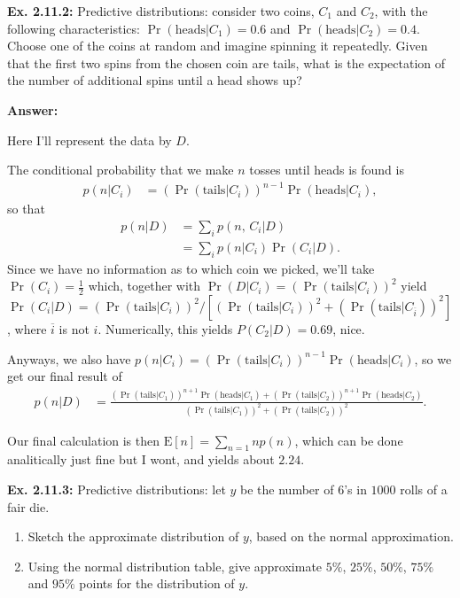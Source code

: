 \documentclass{article}
\newcommand\oname\operatorname
\begin{document}
\textbf{Ex. 2.11.2: }Predictive distributions: consider two coins, $C_1$ and $C_2$, with the following characteristics: $\oname{Pr}(\text{heads}|C_1)=0.6$ and $\oname{Pr}(\text{heads}|C_2)=0.4$. Choose one of the coins at random and imagine spinning it repeatedly. Given that the first two spins from the chosen coin are tails, what is the expectation of the number of additional spins until a head shows up?

\textbf{Answer:}

Here I'll represent the data by $D$.

The conditional probability that we make $n$ tosses until heads is found is
\begin{align*}
	p(n|C_i)&=\left(\oname{Pr}(\text{tails}|C_i)\right)^{n-1}\oname{Pr}(\text{heads}|C_i),
\end{align*}
so that
\begin{align*}
	p(n|D)&=\sum_ip(n,\,C_i|D)\\
	&=\sum_ip(n|C_i)\oname{Pr}(C_i|D).
\end{align*}
Since we have no information as to which coin we picked, we'll take $\oname{Pr}(C_i)=\frac12$ which, together with $\oname{Pr}(D|C_i)=\left(\oname{Pr}(\text{tails}|C_i)\right)^2$ yield $\oname{Pr}(C_i|D)=\left(\oname{Pr}(\text{tails}|C_i)\right)^2/\left[\left(\oname{Pr}(\text{tails}|C_i)\right)^2+\left(\oname{Pr}(\text{tails}|C_{\overline{i}})\right)^2\right]$, where $\overline{i}$ is not $i$. Numerically, this yields $P(C_2|D)=0.69$, nice.

Anyways, we also have $p(n|C_i)=\left(\oname{Pr}(\text{tails}|C_i)\right)^{n-1}\oname{Pr}(\text{heads}|C_i)$, so we get our final result of
\begin{align*}
	p(n|D)&=\frac{\left(\oname{Pr}(\text{tails}|C_1)\right)^{n+1}\oname{Pr}(\text{heads}|C_1)+\left(\oname{Pr}(\text{tails}|C_2)\right)^{n+1}\oname{Pr}(\text{heads}|C_2)}{\left(\oname{Pr}(\text{tails}|C_1)\right)^2+\left(\oname{Pr}(\text{tails}|C_2)\right)^2}.
\end{align*}

Our final calculation is then $\mathrm E[n]=\sum_{n=1}np(n)$, which can be done analitically just fine but I wont, and yields about $2.24$.

\textbf{Ex. 2.11.3: }Predictive distributions: let $y$ be the number of $6$'s in $1000$ rolls of a fair die.
\begin{enumerate}[label=\alph*]
	\item Sketch the approximate distribution of $y$, based on the normal approximation.
	\item Using the normal distribution table, give approximate $5\%$, $25\%$, $50\%$, $75\%$ and $95\%$ points for the distribution of $y$.
\end{enumerate}
\end{document}
